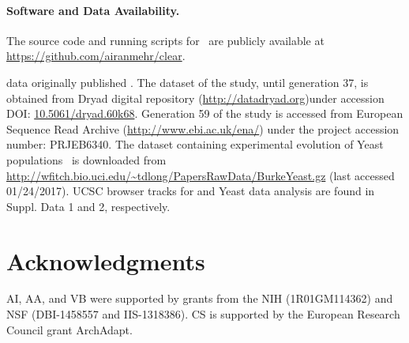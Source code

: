 \paragraph{Software and Data Availability.}

The source code and running scripts for \comale\ are publicly available at 
\url{https://github.com/airanmehr/clear}. 

\dmel data originally published 
\cite{orozco2012adaptation,franssen2015patterns}. The dataset of the 
\dmel study, until generation 37, is obtained from Dryad 
digital repository (\url{http://datadryad.org})under 
accession DOI: 
\href{http://datadryad.org/resource/doi:10.5061/dryad.60k68}{10.5061/dryad.60k68}.
Generation 59 of the \dmel study is accessed from
  European Sequence Read Archive 
  (\href{http://www.ebi.ac.uk/ena/}{http://www.ebi.ac.uk/ena/})  under 
  the 
  project accession number: PRJEB6340.
The dataset containing experimental evolution of Yeast 
populations~\cite{burke2014standing} is 
downloaded from 
\url{http://wfitch.bio.uci.edu/~tdlong/PapersRawData/BurkeYeast.gz}
(last accessed 01/24/2017). 
UCSC browser tracks for \dmel and Yeast data analysis are found in Suppl. Data 
1 and 2, respectively.
\section*{Acknowledgments}
AI, AA, and VB were supported by grants from the NIH (1R01GM114362) and
NSF (DBI-1458557 and IIS-1318386). CS is supported by the European Research 
Council grant ArchAdapt.
